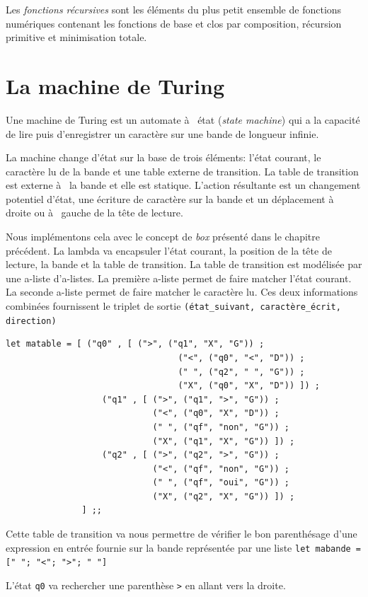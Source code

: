 \documentclass[11pt]{book}
\begin{document}
Les  \textit{fonctions récursives} sont les éléments du plus petit ensemble de fonctions
numériques contenant les fonctions de base et clos par composition, récursion primitive et 
minimisation totale.

\section{La machine de Turing}
Une machine de Turing est un automate à  état (\textit{state machine}) qui a la
capacité de lire puis  d'enregistrer un caractère sur une bande de longueur
infinie. 

La machine change d'état sur la base de trois éléments: l'état courant,
le caractère lu de la bande et une table externe de transition. La table de
transition est externe à  la bande et elle est statique.
 L'action résultante est un changement potentiel d'état, une écriture de
 caractère sur la bande et un déplacement à  droite ou à  gauche de la tête de
 lecture.

Nous implémentons cela avec le concept de \textit{box} présenté dans le chapitre
précédent. La lambda va encapsuler l'état courant, la position de la tête de
lecture, la bande et la table de transition.
La table de transition est modélisée par une a-liste d'a-listes.
La première a-liste permet de faire matcher l'état courant.
La seconde a-liste permet de faire matcher le caractère lu.
Ces deux informations combinées fournissent  le triplet de sortie
\verb+(état_suivant, caractère_écrit, direction)+

\begin{Verbatim}
let matable = [ ("q0" , [ (">", ("q1", "X", "G")) ;
								  ("<", ("q0", "<", "D")) ; 
								  (" ", ("q2", " ", "G")) ;
								  ("X", ("q0", "X",	"D")) ]) ;
			       ("q1" , [ (">", ("q1", ">", "G")) ;
			                 ("<", ("q0", "X", "D")) ;
			                 (" ", ("qf", "non", "G")) ;
			                 ("X", ("q1", "X", "G")) ]) ;
			       ("q2" , [ (">", ("q2", ">", "G")) ;
			                 ("<", ("qf", "non", "G")) ;
			                 (" ", ("qf", "oui", "G")) ;
			                 ("X", ("q2", "X", "G")) ]) ;
			   ] ;;
\end{Verbatim}

Cette table de transition va nous permettre de vérifier le bon parenthésage
d'une expression en entrée fournie sur la bande représentée par une liste 
\verb+let mabande =   [" "; "<"; ">"; " "]+

L'état \verb+q0+ va rechercher une parenthèse \verb+>+ en allant vers la droite.
\end{document}
